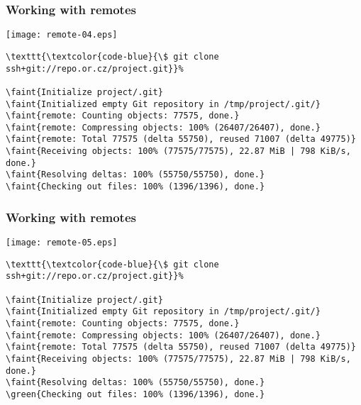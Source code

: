 \documentclass[english]{beamer}
\newcommand{\CMD}[1]{%
\texttt{\textcolor{code-blue}{#1}}%
}
\newcommand{\faint}[1]{%
\textcolor{code-gray}{#1}%
}
\newcommand{\green}[1]{%
\textcolor{code-green}{#1}%
}
\begin{document}
\begin{frame}[fragile]
\frametitle{Working with remotes}

\texttt{[image: remote-04.eps]}

{\tiny
\begin{Verbatim}[commandchars=\\\{\}]
\CMD{\$ git clone ssh+git://repo.or.cz/project.git}
\faint{Initialize project/.git}
\faint{Initialized empty Git repository in /tmp/project/.git/}
\faint{remote: Counting objects: 77575, done.}
\faint{remote: Compressing objects: 100% (26407/26407), done.}
\faint{remote: Total 77575 (delta 55750), reused 71007 (delta 49775)}
\faint{Receiving objects: 100% (77575/77575), 22.87 MiB | 798 KiB/s, done.}
\faint{Resolving deltas: 100% (55750/55750), done.}
\faint{Checking out files: 100% (1396/1396), done.}
\end{Verbatim}
}
\vspace{\textheight}
\end{frame}

\begin{frame}[fragile]
\frametitle{Working with remotes}

\texttt{[image: remote-05.eps]}

{\tiny
\begin{Verbatim}[commandchars=\\\{\}]
\CMD{\$ git clone ssh+git://repo.or.cz/project.git}
\faint{Initialize project/.git}
\faint{Initialized empty Git repository in /tmp/project/.git/}
\faint{remote: Counting objects: 77575, done.}
\faint{remote: Compressing objects: 100% (26407/26407), done.}
\faint{remote: Total 77575 (delta 55750), reused 71007 (delta 49775)}
\faint{Receiving objects: 100% (77575/77575), 22.87 MiB | 798 KiB/s, done.}
\faint{Resolving deltas: 100% (55750/55750), done.}
\green{Checking out files: 100% (1396/1396), done.}
\end{Verbatim}
}
\vspace{\textheight}
\end{frame}
\end{document}
